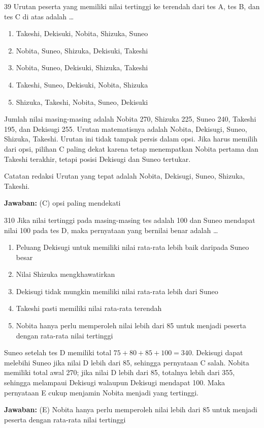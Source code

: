 \documentclass[11pt]{article}
\newenvironment{pil}{\begin{enumerate}[label=(\Alph*),leftmargin=*,itemsep=1pt,topsep=3pt]}{\end{enumerate}}
\newcommand{\jw}[1]{\par\smallskip\begin{jawbox}\textbf{Jawaban:} #1\end{jawbox}}
\begin{document}
\begin{soalbox}{3}{9}
Urutan peserta yang memiliki nilai tertinggi ke terendah dari tes A, tes B, dan tes C di atas adalah \ldots
\begin{pil}\item Takeshi, Dekisuki, Nobita, Shizuka, Suneo \item Nobita, Suneo, Shizuka, Dekisuki, Takeshi \item Nobita, Suneo, Dekisuki, Shizuka, Takeshi \item Takeshi, Suneo, Dekisuki, Nobita, Shizuka \item Shizuka, Takeshi, Nobita, Suneo, Dekisuki\end{pil}
\end{soalbox}
\begin{pembox}
Jumlah nilai masing-masing adalah Nobita 270, Shizuka 225, Suneo 240, Takeshi 195, dan Dekisugi 255. Urutan matematisnya adalah Nobita, Dekisugi, Suneo, Shizuka, Takeshi. Urutan ini tidak tampak persis dalam opsi. Jika harus memilih dari opsi, pilihan C paling dekat karena tetap menempatkan Nobita pertama dan Takeshi terakhir, tetapi posisi Dekisugi dan Suneo tertukar.
\begin{infobox}{Catatan redaksi}
Urutan yang tepat adalah Nobita, Dekisugi, Suneo, Shizuka, Takeshi.
\end{infobox}
\jw{(C) opsi paling mendekati}
\end{pembox}

\begin{soalbox}{3}{10}
Jika nilai tertinggi pada masing-masing tes adalah 100 dan Suneo mendapat nilai 100 pada tes D, maka pernyataan yang bernilai benar adalah \ldots
\begin{pil}\item Peluang Dekisugi untuk memiliki nilai rata-rata lebih baik daripada Suneo besar \item Nilai Shizuka mengkhawatirkan \item Dekisugi tidak mungkin memiliki nilai rata-rata lebih dari Suneo \item Takeshi pasti memiliki nilai rata-rata terendah \item Nobita hanya perlu memperoleh nilai lebih dari 85 untuk menjadi peserta dengan rata-rata nilai tertinggi\end{pil}
\end{soalbox}
\begin{pembox}
Suneo setelah tes D memiliki total $75+80+85+100=340$. Dekisugi dapat melebihi Suneo jika nilai D lebih dari 85, sehingga pernyataan C salah. Nobita memiliki total awal 270; jika nilai D lebih dari 85, totalnya lebih dari 355, sehingga melampaui Dekisugi walaupun Dekisugi mendapat 100. Maka pernyataan E cukup menjamin Nobita menjadi yang tertinggi.
\jw{(E) Nobita hanya perlu memperoleh nilai lebih dari 85 untuk menjadi peserta dengan rata-rata nilai tertinggi}
\end{pembox}
\end{document}
